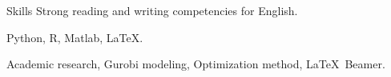 
\begin{rubric}{Skills}
\entry*[Language]
	Strong reading and writing competencies for English.

	Python, R, Matlab, \LaTeX.

\entry*[Misc.]
	Academic research, Gurobi modeling, Optimization method, \LaTeX\ Beamer.
\end{rubric}
